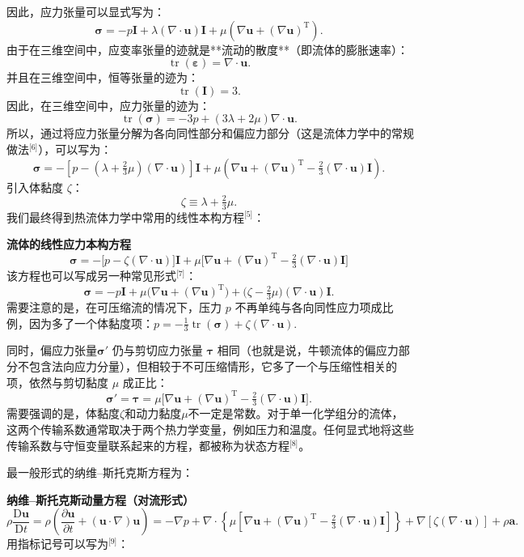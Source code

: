 因此，应力张量可以显式写为：
$$
\boldsymbol{\sigma} = -p\mathbf{I}
+ \lambda (\nabla \cdot \mathbf{u}) \mathbf{I}
+ \mu \left(\nabla \mathbf{u} + (\nabla \mathbf{u})^{\mathrm{T}}\right).~
$$
由于在三维空间中，应变率张量的迹就是**流动的散度**（即流体的膨胀速率）：
$$
\operatorname{tr}(\boldsymbol{\varepsilon}) = \nabla \cdot \mathbf{u}.~
$$
并且在三维空间中，恒等张量的迹为：
$$
\operatorname{tr}(\mathbf{I}) = 3.~
$$
因此，在三维空间中，应力张量的迹为：
$$
\operatorname{tr}(\boldsymbol{\sigma})
= -3p + (3\lambda + 2\mu)\nabla \cdot \mathbf{u}.~
$$
所以，通过将应力张量分解为各向同性部分和偏应力部分（这是流体力学中的常规做法\(^\text{[6]}\)），可以写为：
$$
\boldsymbol{\sigma} =
-\left[
p - \left(\lambda + \tfrac{2}{3}\mu\right)(\nabla \cdot \mathbf{u})
\right]\mathbf{I}
+ \mu \left(
\nabla \mathbf{u} + (\nabla \mathbf{u})^{\mathrm{T}}
- \tfrac{2}{3}(\nabla \cdot \mathbf{u})\mathbf{I}
\right).~
$$
引入体黏度 $\zeta$：
$$
\zeta \equiv \lambda + \tfrac{2}{3}\mu.~
$$
我们最终得到热流体力学中常用的线性本构方程\(^\text{[5]}\)：

\textbf{流体的线性应力本构方程}
$$
\boldsymbol{\sigma} = -\big[p - \zeta (\nabla \cdot \mathbf{u})\big]\mathbf{I}
+ \mu \big[\nabla \mathbf{u} + (\nabla \mathbf{u})^{\mathrm{T}}
- \tfrac{2}{3}(\nabla \cdot \mathbf{u})\mathbf{I} \big]~
$$
该方程也可以写成另一种常见形式\(^\text{[7]}\)：
$$
\boldsymbol{\sigma} = -p\mathbf{I}
+ \mu \big(\nabla \mathbf{u} + (\nabla \mathbf{u})^{\mathrm{T}}\big)
+ \big(\zeta - \tfrac{2}{3}\mu\big)(\nabla \cdot \mathbf{u})\mathbf{I}.~
$$
需要注意的是，在可压缩流的情况下，压力 $p$ 不再单纯与各向同性应力项成比例，因为多了一个体黏度项：$p = -\tfrac{1}{3} \operatorname{tr}(\boldsymbol{\sigma})+ \zeta (\nabla \cdot \mathbf{u})$.

同时，偏应力张量$\boldsymbol{\sigma}'$ 仍与剪切应力张量 $\boldsymbol{\tau}$ 相同（也就是说，牛顿流体的偏应力部分不包含法向应力分量），但相较于不可压缩情形，它多了一个与压缩性相关的项，依然与剪切黏度 $\mu$ 成正比：
$$
\boldsymbol{\sigma}' = \boldsymbol{\tau}
= \mu \big[\nabla \mathbf{u} + (\nabla \mathbf{u})^{\mathrm{T}}
- \tfrac{2}{3}(\nabla \cdot \mathbf{u})\mathbf{I} \big].~
$$
需要强调的是，体黏度$\zeta$和动力黏度$\mu$不一定是常数。对于单一化学组分的流体，这两个传输系数通常取决于两个热力学变量，例如压力和温度。任何显式地将这些传输系数与守恒变量联系起来的方程，都被称为状态方程\(^\text{[8]}\)。

最一般形式的纳维–斯托克斯方程为：

\textbf{纳维–斯托克斯动量方程（对流形式）}
$$
\rho \frac{\mathrm{D} \mathbf{u}}{\mathrm{D} t}
= \rho \left(\frac{\partial \mathbf{u}}{\partial t} + (\mathbf{u} \cdot \nabla) \mathbf{u} \right)
= -\nabla p
+ \nabla \cdot \left\{
\mu \left[
\nabla \mathbf{u} + (\nabla \mathbf{u})^{\mathrm{T}}
- \tfrac{2}{3} (\nabla \cdot \mathbf{u}) \mathbf{I}
\right]
\right\}
+ \nabla \left[\zeta (\nabla \cdot \mathbf{u})\right]
+ \rho \mathbf{a}.~
$$
用指标记号可以写为\(^\text{[9]}\)：

